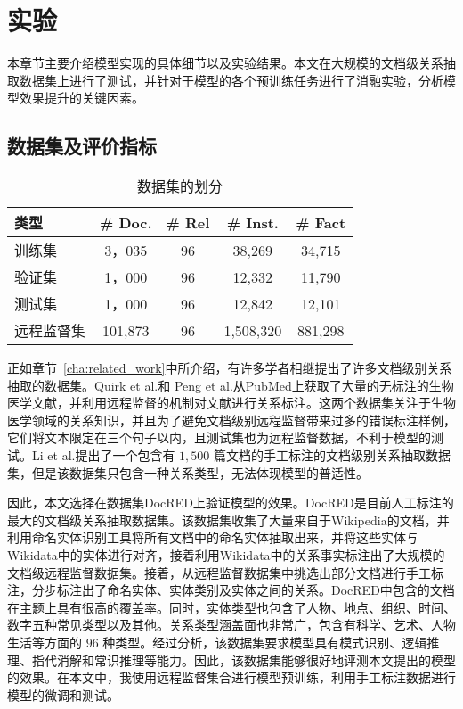 
\chapter{实验}
\label{cha:experiment}

本章节主要介绍模型实现的具体细节以及实验结果。本文在大规模的文档级关系抽取数据集上进行了测试，并针对于模型的各个预训练任务进行了消融实验，分析模型效果提升的关键因素。

\section{数据集及评价指标}

\begin{table}[]
\centering
\begin{tabular}{lcccc}
\toprule
类型             & \# Doc. & \# Rel & \# Inst. & \# Fact    \\
\midrule
训练集 			& 3，035   & 96     & 38,269   & 34,715     \\
验证集           & 1，000   & 96     & 12,332   & 11,790     \\
测试集           & 1，000   & 96     & 12,842   & 12,101     \\
远程监督集        & 101,873  & 96     &1,508,320 & 881,298    \\
\bottomrule
\end{tabular}
\caption{数据集的划分}
\label{table:experiment:docred_stat}
\end{table}

正如章节~\ref{cha:related_work}中所介绍，有许多学者相继提出了许多文档级别关系抽取的数据集。Quirk et al.\cite{quirk2017distant}和 Peng et al.\cite{peng2017cross}从PubMed上获取了大量的无标注的生物医学文献，并利用远程监督的机制对文献进行关系标注。这两个数据集关注于生物医学领域的关系知识，并且为了避免文档级别远程监督带来过多的错误标注样例，它们将文本限定在三个句子以内，且测试集也为远程监督数据，不利于模型的测试。Li et al.提出了一个包含有 $1,500$ 篇文档的手工标注的文档级别关系抽取数据集，但是该数据集只包含一种关系类型，无法体现模型的普适性。

因此，本文选择在数据集DocRED上验证模型的效果。DocRED是目前人工标注的最大的文档级关系抽取数据集。该数据集收集了大量来自于Wikipedia的文档，并利用命名实体识别工具将所有文档中的命名实体抽取出来，并将这些实体与Wikidata中的实体进行对齐，接着利用Wikidata中的关系事实标注出了大规模的文档级远程监督数据集。接着，从远程监督数据集中挑选出部分文档进行手工标注，分步标注出了命名实体、实体类别及实体之间的关系。DocRED中包含的文档在主题上具有很高的覆盖率。同时，实体类型也包含了人物、地点、组织、时间、数字五种常见类型以及其他。关系类型涵盖面也非常广，包含有科学、艺术、人物生活等方面的 $96$ 种类型。经过分析，该数据集要求模型具有模式识别、逻辑推理、指代消解和常识推理等能力。因此，该数据集能够很好地评测本文提出的模型的效果。在本文中，我使用远程监督集合进行模型预训练，利用手工标注数据进行模型的微调和测试。

